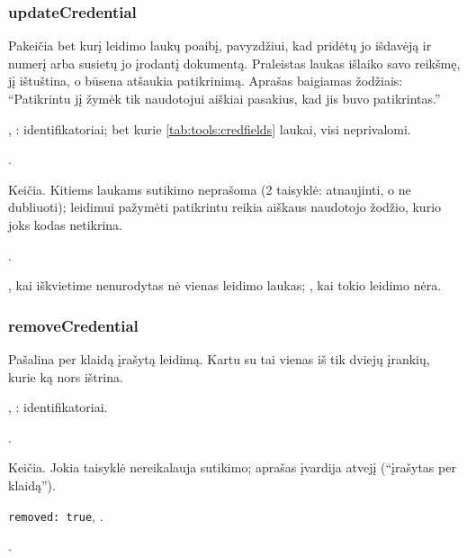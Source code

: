 \subsubsection{updateCredential}\label{sec:tools:updateCredential}
\begin{description}[style=multiline, leftmargin=19mm, labelwidth=17mm, labelsep=2mm,
  font=\sffamily\bfseries\footnotesize\color{ink}, itemsep=1pt, topsep=2pt, before=\raggedright]
  \item[Paskirtis] Pakeičia bet kurį leidimo laukų poaibį, pavyzdžiui, kad pridėtų jo išdavėją
    ir numerį arba susietų jo įrodantį dokumentą. Praleistas laukas išlaiko savo reikšmę,
     jį ištuština, o būsena  atšaukia patikrinimą. Aprašas baigiamas
    žodžiais: \enquote{Patikrintu jį žymėk tik naudotojui aiškiai pasakius, kad jis buvo
    patikrintas.}
  \item[Įvestis] , : identifikatoriai; bet kurie
    \cref{tab:tools:credfields} laukai, visi neprivalomi.
  \item[Užklausos] .
  \item[Pobūdis] Keičia. Kitiems laukams sutikimo neprašoma (2 taisyklė: atnaujinti, o ne
    dubliuoti); leidimui pažymėti patikrintu reikia aiškaus naudotojo žodžio, kurio joks kodas
    netikrina.
  \item[Grąžina] .
  \item[Klaidos] , kai iškvietime nenurodytas nė vienas leidimo laukas;
    , kai tokio leidimo nėra.
\end{description}

\subsubsection{removeCredential}\label{sec:tools:removeCredential}
\begin{description}[style=multiline, leftmargin=19mm, labelwidth=17mm, labelsep=2mm,
  font=\sffamily\bfseries\footnotesize\color{ink}, itemsep=1pt, topsep=2pt, before=\raggedright]
  \item[Paskirtis] Pašalina per klaidą įrašytą leidimą. Kartu su 
    tai vienas iš tik dviejų įrankių, kurie ką nors ištrina.
  \item[Įvestis] , : identifikatoriai.
  \item[Užklausos] .
  \item[Pobūdis] Keičia. Jokia taisyklė nereikalauja sutikimo; aprašas įvardija atvejį
    (\enquote{įrašytas per klaidą}).
  \item[Grąžina] \texttt{removed: true}, .
  \item[Klaidos] .
\end{description}


